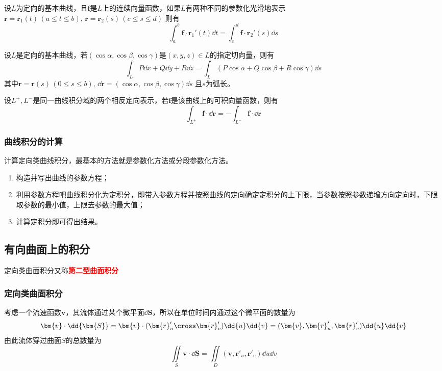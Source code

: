 \begin{theorem}
    设$L$为定向的基本曲线，且$\bm{f}$是$L$上的连续向量函数，如果$L$有两种不同的参数化光滑地表示$\bm{r} = \bm{r}_1(t)\,(a\leq t\leq b),\, \bm{r}=\bm{r}_2(s)\, (c\leq s \leq d)$
    则有
    \[ \int_a^b \bm{f}\cdot\bm{r}_1'(t)\dd{t} = \int_c^d \bm{f}\cdot\bm{r}_2'(s)\dd{s} \]
\end{theorem}

\begin{theorem}
    设$L$是定向的基本曲线，若$(\cos\alpha,\cos\beta,\cos\gamma)$是$(x,y,z)\in L$的指定切向量，则有
    \[ \int_L P\dd{x} + Q\dd{y} + R\dd{z} = \int_L (P\cos\alpha + Q\cos\beta + R\cos\gamma)\dd{s} \]
    其中$\bm{r} =\bm{r}(s)\,(0\leq s\leq b),\, \dd{\bm{r}} = (\cos\alpha,\cos\beta,\cos\gamma)\dd{s}$
    且$s$为弧长。
\end{theorem}

\begin{theorem}
    设$L^+, L^-$是同一曲线积分域的两个相反定向表示，若$\bm{f}$是该曲线上的可积向量函数，则有
    \[ \int_{L^+} \bm{f}\cdot\dd{\bm{r}} = - \int_{L^-}\bm{f}\cdot\dd{\bm{r}} \]
\end{theorem}

\subsubsection{曲线积分的计算}
计算定向类曲线积分，最基本的方法就是参数化方法或分段参数化方法。
\begin{enumerate}[(1)]
    \item 构造并写出曲线的参数方程；
    \item 利用参数方程吧曲线积分化为定积分，即带入参数方程并按照曲线的定向确定定积分的上下限，当参数按照参数递增方向定向时，下限取参数的最小值，上限去参数的最大值；
    \item 计算定积分即可得出结果。
\end{enumerate}

\subsection{有向曲面上的积分}
定向类曲面积分又称\textcolor{red}{\textbf{\textsf{第二型曲面积分}}}
\subsubsection{定向类曲面积分}
考虑一个流速函数$\bm{v}$，其流体通过某个微平面$\dd{\bm{S}}$，所以在单位时间内通过这个微平面的数量为
\[ \bm{v}\cdot\dd{\bm{S}} = \bm{v}\cdot(\bm{r}'_u \cross \bm{r}'_v)\dd{u}\dd{v} = (\bm{v},\bm{r}'_u,\bm{r}'_v)\dd{u}\dd{v} \]
由此流体穿过曲面$S$的总数量为
\[ \iint\limits_S \bm{v}\cdot\dd{\bm{S}} = \iint\limits_D (\bm{v},\bm{r}'_u,\bm{r}'_v)\dd{u}\dd{v} \]

